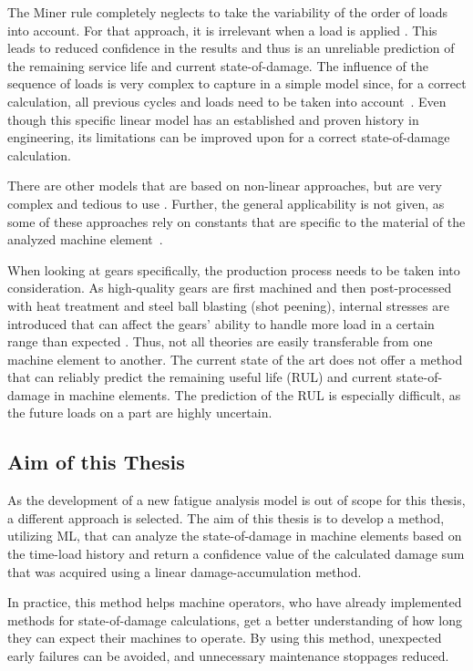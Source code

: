The Miner rule completely neglects to take the variability of the order of loads into account. For that approach, it is irrelevant when a load is applied \cite{ISO1}. 
This leads to reduced confidence in the results and thus is an unreliable prediction of the remaining service life and current state-of-damage.
The influence of the sequence of loads is very complex to capture in a simple model since, for a correct calculation, all previous cycles and loads need to be taken into account~\cite{Vietze}. Even though this specific linear model has an established and proven history in engineering, its limitations can be improved upon for a correct state-of-damage calculation.

There are other models that are based on non-linear approaches, but are very complex and tedious to use \cite{Vietze}. Further, the general applicability is not given, as some of these approaches rely on constants that are specific to the material of the analyzed machine element~\cite{Sander}.

When looking at gears specifically, the production process needs to be taken into consideration. As high-quality gears are first machined and then post-processed with heat treatment and steel ball blasting (shot peening), internal stresses are introduced that can affect the gears' ability to handle more load in a certain range than expected \cite{Benedetti}. 
Thus, not all theories are easily transferable from one machine element to another. The current state of the art does not offer a method that can reliably predict the remaining useful life (RUL) and current state-of-damage in machine elements. The prediction of the RUL is especially difficult, as the future loads on a part are highly uncertain.


\subsection{Aim of this Thesis}
As the development of a new fatigue analysis model is out of scope for this thesis, a different approach is selected.
The aim of this thesis is to develop a method, utilizing ML, that can analyze the state-of-damage in machine elements based on the time-load history and return a confidence value of the calculated damage sum that was acquired using a linear damage-accumulation method.

In practice, this method helps machine operators, who have already implemented methods for state-of-damage calculations, get a better understanding of how long they can expect their machines to operate. By using this method, unexpected early failures can be avoided, and unnecessary maintenance stoppages reduced. 

